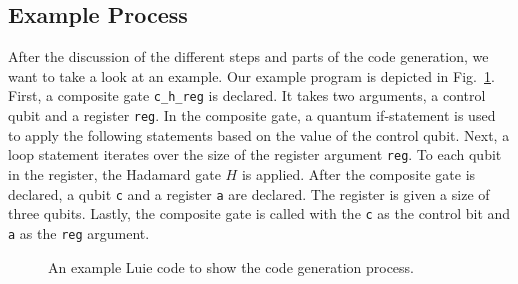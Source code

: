 \subsection{Example Process}
\label{sec:implementation_codeGen_example}
After the discussion of the different steps and parts of the code generation, we want to take a look at an example. Our example program is depicted in Fig.~\ref{fig:codeGen_source_example}. First, a composite gate \texttt{c\_h\_reg} is declared. It takes two arguments, a control qubit and a register \texttt{reg}. In the composite gate, a quantum if-statement is used to apply the following statements based on the value of the control qubit. Next, a loop statement iterates over the size of the register argument \texttt{reg}. To each qubit in the register, the Hadamard gate $H$ is applied. After the composite gate is declared, a qubit \texttt{c} and a register \texttt{a} are declared. The register is given a size of three qubits. Lastly, the composite gate is called with the \texttt{c} as the control bit and \texttt{a} as the \texttt{reg} argument.

\begin{figure}
    \centering
    
    \caption{An example Luie code to show the code generation process.}
    \label{fig:codeGen_source_example}
\end{figure}

